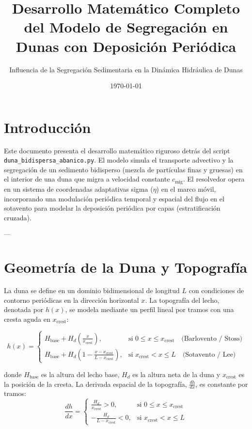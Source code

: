 \documentclass[11pt,a4paper]{article}
\title{\textbf{Desarrollo Matemático Completo del Modelo de Segregación en Dunas con Deposición Periódica}}
\author{Influencia de la Segregación Sedimentaria en la Dinámica Hidráulica de Dunas}
\date{\today}
\begin{document}
\maketitle

\tableofcontents
\newpage

\section{Introducción}
Este documento presenta el desarrollo matemático riguroso detrás del script \texttt{duna\_bidispersa\_abanico.py}. El modelo simula el transporte advectivo y la segregación de un sedimento bidisperso (mezcla de partículas finas y gruesas) en el interior de una duna que migra a velocidad constante $c_{\text{mig}}$. El resolvedor opera en un sistema de coordenadas adaptativas sigma ($\eta$) en el marco móvil, incorporando una modulación periódica temporal y espacial del flujo en el sotavento para modelar la deposición periódica por capas (estratificación cruzada).

---

\section{Geometría de la Duna y Topografía}
La duna se define en un dominio bidimensional de longitud $L$ con condiciones de contorno periódicas en la dirección horizontal $x$. La topografía del lecho, denotada por $h(x)$, se modela mediante un perfil lineal por tramos con una cresta aguda en $x_{\text{crest}}$:

\begin{equation}
h(x) = \begin{cases} 
H_{\text{base}} + H_d \left( \frac{x}{x_{\text{crest}}} \right), & \text{si } 0 \le x \le x_{\text{crest}} \quad \text{(Barlovento / Stoss)} \\
H_{\text{base}} + H_d \left( 1 - \frac{x - x_{\text{crest}}}{L - x_{\text{crest}}} \right), & \text{si } x_{\text{crest}} < x \le L \quad \text{(Sotavento / Lee)}
\end{cases}
\end{equation}

donde $H_{\text{base}}$ es la altura del lecho base, $H_d$ es la altura neta de la duna y $x_{\text{crest}}$ es la posición de la cresta.
La derivada espacial de la topografía, $\frac{dh}{dx}$, es constante por tramos:
\begin{equation}
\frac{dh}{dx} = \begin{cases} 
\frac{H_d}{x_{\text{crest}}} > 0, & \text{si } 0 \le x \le x_{\text{crest}} \\
-\frac{H_d}{L - x_{\text{crest}}} < 0, & \text{si } x_{\text{crest}} < x \le L
\end{cases}
\end{equation}
\end{document}
